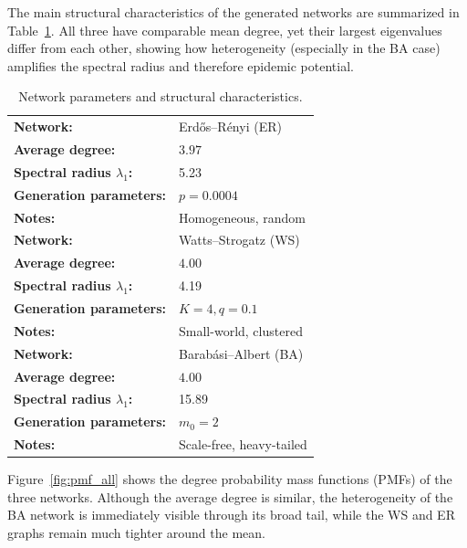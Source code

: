 \documentclass[pdflatex,sn-mathphys-num]{sn-jnl}%
\theoremstyle{thmstyleone}%
\theoremstyle{thmstyletwo}%
\theoremstyle{thmstylethree}%
\begin{document}
The main structural characteristics of the generated networks are summarized in
Table~\ref{tab:networks}.  
All three have comparable mean degree, yet their largest eigenvalues differ from each other,
showing how heterogeneity (especially in the BA case) amplifies the spectral radius
and therefore epidemic potential.

\begin{table}[t]
\centering
\caption{Network parameters and structural characteristics.}
\label{tab:networks-vertical}
\begin{tabular}{ll}
\toprule
\textbf{Network:} & Erd\H{o}s--R\'enyi (ER) \\
\textbf{Average degree:} & $3.97$ \\
\textbf{Spectral radius $\lambda_1$:} & 5.23 \\
\textbf{Generation parameters:} & $p = 0.0004$ \\
\textbf{Notes:} & Homogeneous, random \\
\midrule
\textbf{Network:} & Watts--Strogatz (WS) \\
\textbf{Average degree:} & $4.00$ \\
\textbf{Spectral radius $\lambda_1$:} & 4.19 \\
\textbf{Generation parameters:} & $K = 4, q = 0.1$ \\
\textbf{Notes:} & Small-world, clustered \\
\midrule
\textbf{Network:} & Barab\'asi--Albert (BA) \\
\textbf{Average degree:} & $4.00$ \\
\textbf{Spectral radius $\lambda_1$:} & 15.89 \\
\textbf{Generation parameters:} & $m_0 = 2$ \\
\textbf{Notes:} & Scale-free, heavy-tailed \\
\bottomrule
\end{tabular}
\label{tab:networks}
\end{table}


Figure~\ref{fig:pmf_all} shows the degree probability mass functions (PMFs) of the
three networks.  
Although the average degree is similar, the heterogeneity of the BA network is
immediately visible through its broad tail, while the WS and ER graphs remain much
tighter around the mean.
\end{document}
